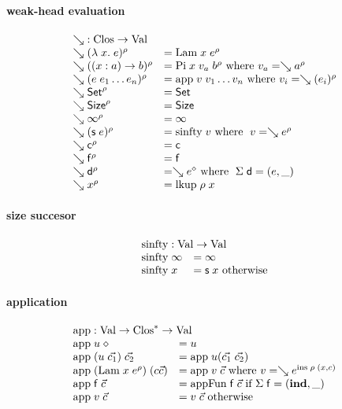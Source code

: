 \paragraph*{weak-head evaluation}


\[
\begin{array}{ll}
\multicolumn{2}{l}{\wh \; : \Clos \ra \Val}\\
\wh \clp{\lam{x}{e}}{\rho} & = \vlam \; x \; \cl{e}{\rho} \\
\wh \clp{\EPi{x}{a}{b}}{\rho} &= \vpi \; x \; v_a \; \cl{b}{\rho} \mbox{ where } v_a = \wh \cl{a}{\rho} \\
\wh \clp{e \; e_1 \ldots e_n}{\rho} &= \ap \; v \; v_1 \ldots v_n \mbox{ where } v_i = \wh \cl{(e_i)}{\rho} \\
\wh \cl{\Set}{\rho} & = \Set \\ 
\wh \cl{\Size}{\rho} & = \Size \\
\wh \cl{\infty}{\rho} & = \infty  \\
\wh \clp{\s e}{\rho} & = \sinfty \; v \mbox{ where } \; v = \wh \cl{e}{\rho} \\ 
\wh \cl{\cc}{\rho} & = \cc  \\
\wh \cl{\ff}{\rho} & = \ff \\
\wh \cl{\dd}{\rho} & = \wh \cl{e}{\diamond} \mbox{ where } \; \Sig \; \dd = (e,\_)\\
\wh \cl{x}{\rho} & = \lkup \; \rho \; x \\
\end{array}
\]

\paragraph*{size succesor}

\[
\begin{array}[t]{ll}
\multicolumn{2}{l}{\sinfty : \Val \ra \Val}\\ 
\sinfty \; \infty & = \infty\\
\sinfty \;  x & = \s x  \mbox{ otherwise}\\ 
\end{array}
\]
\paragraph*{application}
\[
\begin{array}{ll}
\multicolumn{2}{l}{\ap : \Val \ra \ves{\Clos} \ra \Val}\\
\ap \; u \; \diamond & = u \\
\ap \; (u \; \vec{c_1}) \; \vec{c_2} & = \ap \; u (\vec{c_1}\;\vec{c_2})\\
\ap \; (\vlam \; x \; \cl{e}{\rho}) \; (c \vec{c}) & = \ap \; v \; \vec{c} \mbox{ where } v = \wh \cl{e}{\ins \; \rho \; (x,c)} \\ 
\ap \; \ff \; \vec{c} & = \apf \; \ff \; \vec{c} \mbox{ if } \Sig \; \ff = (\ind,\_) \\
\ap \; v \; \vec{c} & = v \; \vec{c} \mbox{ otherwise } \\
\end{array}
\]

